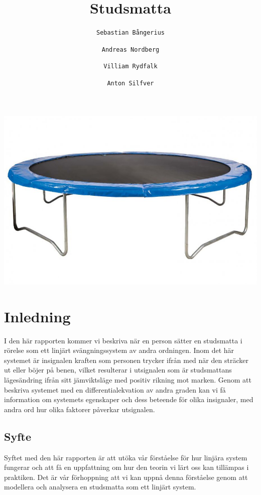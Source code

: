 \documentclass[10pt,a4paper]{article}
\author{
  \texttt{Sebastian Bångerius}
  \and
  \texttt{Andreas Nordberg}
  \and
  \texttt{Villiam Rydfalk}
  \and
  \texttt{Anton Silfver}
}
\begin{document}

\title{Studsmatta}
\maketitle
\includegraphics[scale=0.35]{Framsida}
\cleardoublepage

\tableofcontents

\clearpage

\section{Inledning}
\setcounter{page}{3}

I den här rapporten kommer vi beskriva när en person sätter en studsmatta i rörelse som ett linjärt svängningssystem av andra ordningen. Inom det här systemet är insignalen kraften som personen trycker ifrån med när den sträcker ut eller böjer på benen, vilket resulterar i utsignalen som är studsmattans lägesändring ifrån sitt jämviktsläge med positiv rikning mot marken. Genom att beskriva systemet med en differentialekvation av andra graden kan vi få information om systemets egenskaper och dess beteende för olika insignaler, med andra ord hur olika faktorer påverkar utsignalen.

\subsection{Syfte}
Syftet med den här rapporten är att utöka vår förståelse för hur linjära system fungerar och att få en uppfattning om hur den teorin vi lärt oss kan tillämpas i praktiken. Det är vår förhoppning att vi kan uppnå denna förståelse genom att modellera och analysera en studsmatta som ett linjärt system.
\end{document}

